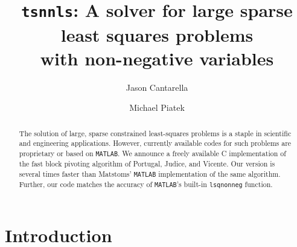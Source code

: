 \documentclass[onecolumn,12pt,tightenlines,amsmath,secnumarabic,%
    floatfix,amssymb,aps,nofootinbib,letterpaper, showkeys]{revtex4}
\def\marginpar#1{}   %
\let\lbl=\label
\def\label#1{\lbl{#1}\ifinner\else\marginpar{\ref{#1} #1}\ignorespaces\fi}
\begin{document}
\title{\texttt{tsnnls}: A solver for large sparse least squares problems \\ with non-negative variables}

\author{Jason Cantarella}

\author{Michael Piatek}


\begin{abstract}
The solution of large, sparse constrained least-squares problems is a staple in 
scientific and engineering applications. However, currently available codes
for such problems are proprietary or based on \texttt{MATLAB}. We announce a freely available C implementation of the fast block pivoting algorithm of Portugal, Judice, and Vicente. 
Our version is several times faster than Matstoms' \texttt{MATLAB} implementation of the same algorithm. Further, our code matches the accuracy of \texttt{MATLAB}'s built-in \texttt{lsqnonneg} function. 
\end{abstract}






\maketitle

\section{Introduction}
\label{sec:intro}
\end{document}
